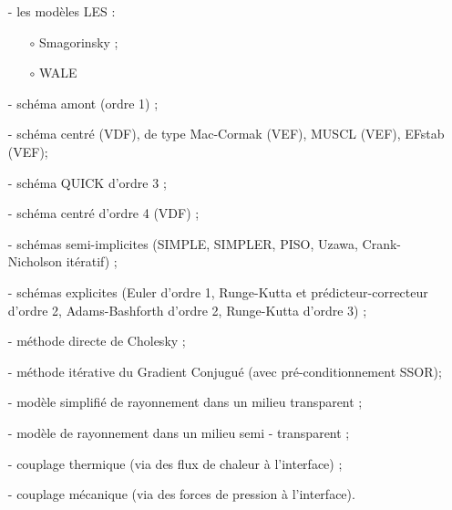 \begin{itemize}
\begin{itemize}
\item[-]
les mod\`eles LES :
\begin{itemize}
\item[$\circ$]
Smagorinsky ;
\item[$\circ$]
WALE
\end{itemize}
\end{itemize}
\begin{itemize}
\item[-]
sch\'ema amont (ordre 1) ;
\item[-]
sch\'ema centr\'e (VDF), de type Mac-Cormak (VEF), MUSCL (VEF), EFstab (VEF);
\item[-]
sch\'ema QUICK d'ordre 3 ;
\item[-]
sch\'ema centr\'e d'ordre 4 (VDF) ;\\
\end{itemize}
\begin{itemize}
\item[-]
sch\'emas semi-implicites (SIMPLE, SIMPLER, PISO, Uzawa, Crank-Nicholson it\'eratif) ;
\item[-]
sch\'emas explicites (Euler d'ordre 1, Runge-Kutta et pr\'edicteur-correcteur d'ordre 2, Adams-Bashforth d'ordre 2, Runge-Kutta d'ordre 3) ;\\
\end{itemize}
\begin{itemize}
\item[-]
m\'ethode directe de Cholesky ;
\item[-]
m\'ethode it\'erative du Gradient Conjugu\'e (avec pr\'e-conditionnement SSOR);\\
\end{itemize}
\begin{itemize}
\item[-]
mod\`ele simplifi\'e de rayonnement dans un milieu transparent ;
\item[-]
mod\`ele de rayonnement dans un milieu semi - transparent ;\\
\end{itemize}
\begin{itemize}
\item[-]
couplage thermique (via des flux de chaleur \`a l'interface) ;
\item[-]
couplage m\'ecanique (via des forces de pression \`a l'interface).
\end{itemize}
\end{itemize}


